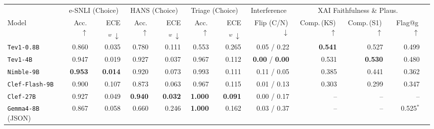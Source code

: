 \begin{tabular}{lrrrrrrrrrrr}
\toprule
 & \multicolumn{2}{c}{e-SNLI (Choice)} & \multicolumn{2}{c}{HANS (Choice)} & \multicolumn{2}{c}{Triage (Choice)} & \multicolumn{1}{c}{Interference} & \multicolumn{3}{c}{XAI Faithfulness \& Plaus.} \\
\cmidrule(lr){2-3}\cmidrule(lr){4-5}\cmidrule(lr){6-7}\cmidrule(lr){8-8}\cmidrule(lr){9-11}
Model & Acc.\,$\uparrow$ & ECE$_{w}\,\downarrow$ & Acc.\,$\uparrow$ & ECE$_{w}\,\downarrow$ & Acc.\,$\uparrow$ & ECE$_{w}\,\downarrow$ & Flip (C/N)\,$\downarrow$ & Comp.\,(KS)\,$\uparrow$ & Comp.\,(S1)\,$\uparrow$ & Flag@g\,$\uparrow$ \\
\midrule
\texttt{Tev1-0.8B} & 0.860 & 0.035 & 0.780 & 0.111 & 0.553 & 0.265 & 0.05 / 0.22 & \textbf{0.541} & 0.527 & 0.499 \\
\texttt{Tev1-4B} & 0.947 & 0.019 & 0.927 & 0.037 & 0.967 & 0.112 & \textbf{0.00} / \textbf{0.00} & 0.531 & \textbf{0.530} & 0.480 \\
\texttt{Nimble-9B} & \textbf{0.953} & \textbf{0.014} & 0.920 & 0.073 & 0.993 & 0.111 & 0.11 / 0.05 & 0.385 & 0.441 & 0.362 \\
\texttt{Clef-Flash-9B} & 0.900 & 0.107 & 0.873 & 0.063 & 0.967 & 0.115 & 0.01 / 0.13 & 0.303 & 0.299 & 0.347 \\
\texttt{Clef-27B} & 0.927 & 0.049 & \textbf{0.940} & \textbf{0.032} & \textbf{1.000} & \textbf{0.091} & 0.00 / 0.17 & -- & -- & -- \\
\midrule
\texttt{Gemma4-8B} (JSON) & 0.867 & 0.058 & 0.660 & 0.246 & \textbf{1.000} & 0.162 & 0.03 / 0.37 & -- & -- & 0.525$^*$ \\
\bottomrule
\end{tabular}
